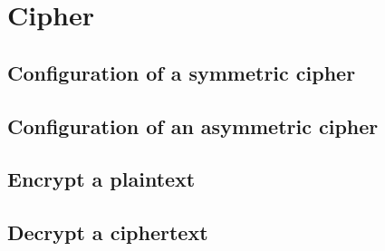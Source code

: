 \chapter{Cipher}

\section{Configuration of a symmetric cipher}

\section{Configuration of an asymmetric cipher}

\section{Encrypt a plaintext}

\section{Decrypt a ciphertext}